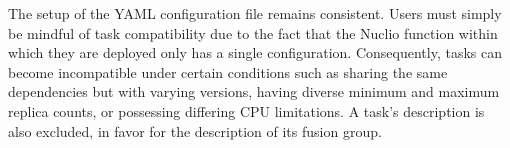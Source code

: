 The setup of the YAML configuration file remains consistent. Users must simply
be mindful of task compatibility due to the fact that the Nuclio function within
which they are deployed only has a single configuration. Consequently, tasks can
become incompatible under certain conditions such as sharing the same
dependencies but with varying versions, having diverse minimum and maximum
replica counts, or possessing differing CPU limitations. A task's description is
also excluded, in favor for the description of its fusion group.
